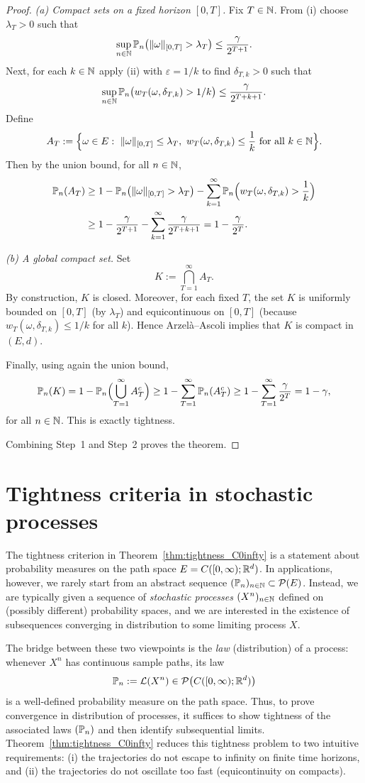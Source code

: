 \begin{proof}[Proof]
\smallskip
\emph{(a) Compact sets on a fixed horizon $[0,T]$.}
Fix $T\in\mathbb{N}$.
From (i) choose $\lambda_T>0$ such that
\[
\sup_{n\in\mathbb{N}}\mathbb{P}_n\bigl(\|\omega\|_{[0,T]}>\lambda_T\bigr)\le \frac{\gamma}{2^{T+1}}.
\]
Next, for each $k\in\mathbb{N}$ apply (ii) with $\varepsilon=1/k$ to find $\delta_{T,k}>0$ such that
\[
\sup_{n\in\mathbb{N}}\mathbb{P}_n\bigl(w_T(\omega,\delta_{T,k})>1/k\bigr)\le \frac{\gamma}{2^{T+k+1}}.
\]
Define
\[
A_T
:=\Bigl\{\omega\in E:\ \|\omega\|_{[0,T]}\le \lambda_T,\ 
w_T(\omega,\delta_{T,k})\le \frac1k\ \text{for all }k\in\N\Bigr\}.
\]
Then by the union bound, for all $n\in\mathbb{N}$,
\begin{align*}
\mathbb{P}_n(A_T)
&\ge 1-\mathbb{P}_n\bigl(\|\omega\|_{[0,T]}>\lambda_T\bigr)
   -\sum_{k=1}^\infty \mathbb{P}_n\Bigl(w_T(\omega,\delta_{T,k})>\frac1k\Bigr)\\
&\ge 1-\frac{\gamma}{2^{T+1}}-\sum_{k=1}^\infty \frac{\gamma}{2^{T+k+1}}
= 1-\frac{\gamma}{2^T}.
\end{align*}

\smallskip
\emph{(b) A global compact set.}
Set
\[
K:=\bigcap_{T=1}^\infty A_T.
\]
By construction, $K$ is closed. Moreover, for each fixed $T$, the set $K$ is uniformly bounded
on $[0,T]$ (by $\lambda_T$) and equicontinuous on $[0,T]$ (because
$w_T(\omega,\delta_{T,k})\le 1/k$ for all $k$).
Hence Arzel\`a--Ascoli implies that $K$ is compact in $(E,d)$.

Finally, using again the union bound,
\[
\mathbb{P}_n(K)
=1-\mathbb{P}_n\Bigl(\bigcup_{T=1}^\infty A_T^c\Bigr)
\ge 1-\sum_{T=1}^\infty \mathbb{P}_n(A_T^c)
\ge 1-\sum_{T=1}^\infty \frac{\gamma}{2^T}
=1-\gamma,
\]
for all $n\in\mathbb{N}$. This is exactly tightness.

\medskip
Combining Step~1 and Step~2 proves the theorem.
\end{proof}

\section{Tightness criteria in stochastic processes}
The tightness criterion in Theorem~\ref{thm:tightness_C0infty} is a statement about probability
measures on the path space $E=C([0,\infty);\mathbb{R}^d)$.  In applications, however, we rarely start from
an abstract sequence $(\mathbb{P}_n)_{n\in\mathbb{N}}\subset\mathcal{P}(E)$.  Instead, we are typically given a
sequence of \emph{stochastic processes} $(X^n)_{n\in\mathbb{N}}$ defined on (possibly different)
probability spaces, and we are interested in the existence of subsequences converging in
distribution to some limiting process $X$.

The bridge between these two viewpoints is the \emph{law} (distribution) of a process:
whenever $X^n$ has continuous sample paths, its law
\[
\mathbb{P}_n:=\mathcal{L}(X^n)\in\mathcal{P}\bigl(C([0,\infty);\mathbb{R}^d)\bigr)
\]
is a well-defined probability measure on the path space.  Thus, to prove convergence in
distribution of processes, it suffices to show tightness of the associated laws $(\mathbb{P}_n)$ and then
identify subsequential limits.  Theorem~\ref{thm:tightness_C0infty} reduces this tightness problem
to two intuitive requirements: (i) the trajectories do not escape to infinity on finite time
horizons, and (ii) the trajectories do not oscillate too fast (equicontinuity on compacts).

